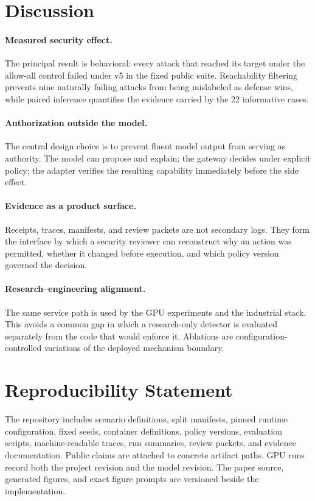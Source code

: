 \documentclass[10pt,twocolumn]{article}
\begin{document}
\section{Discussion}
\paragraph{Measured security effect.} The principal result is behavioral: every attack that reached its target under the allow-all control failed under v5 in the fixed public suite. Reachability filtering prevents nine naturally failing attacks from being mislabeled as defense wins, while paired inference quantifies the evidence carried by the 22 informative cases.

\paragraph{Authorization outside the model.} The central design choice is to prevent fluent model output from serving as authority. The model can propose and explain; the gateway decides under explicit policy; the adapter verifies the resulting capability immediately before the side effect.

\paragraph{Evidence as a product surface.} Receipts, traces, manifests, and review packets are not secondary logs. They form the interface by which a security reviewer can reconstruct why an action was permitted, whether it changed before execution, and which policy version governed the decision.

\paragraph{Research--engineering alignment.} The same service path is used by the GPU experiments and the industrial stack. This avoids a common gap in which a research-only detector is evaluated separately from the code that would enforce it. Ablations are configuration-controlled variations of the deployed mechanism boundary.

\section{Reproducibility Statement}
The repository includes scenario definitions, split manifests, pinned runtime configuration, fixed seeds, container definitions, policy versions, evaluation scripts, machine-readable traces, run summaries, review packets, and evidence documentation. Public claims are attached to concrete artifact paths. GPU runs record both the project revision and the model revision. The paper source, generated figures, and exact figure prompts are versioned beside the implementation.
\end{document}
